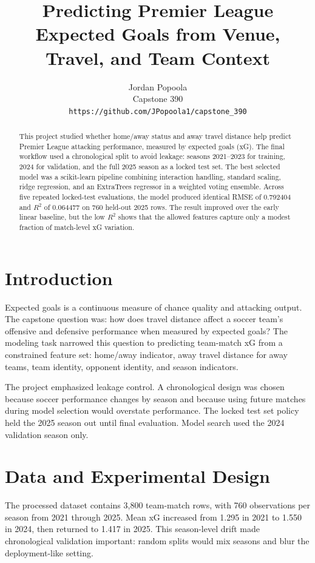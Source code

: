 \documentclass{article}
\title{Predicting Premier League Expected Goals from Venue, Travel, and Team Context}
\author{Jordan Popoola\\Capstone 390\\\texttt{https://github.com/JPopoola1/capstone_390}}
\begin{document}
\maketitle

\begin{abstract}
This project studied whether home/away status and away travel distance help predict Premier League attacking performance, measured by expected goals (xG). The final workflow used a chronological split to avoid leakage: seasons 2021--2023 for training, 2024 for validation, and the full 2025 season as a locked test set. The best selected model was a scikit-learn pipeline combining interaction handling, standard scaling, ridge regression, and an ExtraTrees regressor in a weighted voting ensemble. Across five repeated locked-test evaluations, the model produced identical RMSE of 0.792404 and $R^2$ of 0.064477 on 760 held-out 2025 rows. The result improved over the early linear baseline, but the low $R^2$ shows that the allowed features capture only a modest fraction of match-level xG variation.
\end{abstract}

\section{Introduction}
Expected goals is a continuous measure of chance quality and attacking output. The capstone question was: how does travel distance affect a soccer team's offensive and defensive performance when measured by expected goals? The modeling task narrowed this question to predicting team-match xG from a constrained feature set: home/away indicator, away travel distance for away teams, team identity, opponent identity, and season indicators.

The project emphasized leakage control. A chronological design was chosen because soccer performance changes by season and because using future matches during model selection would overstate performance. The locked test set policy held the 2025 season out until final evaluation. Model search used the 2024 validation season only.

\section{Data and Experimental Design}
The processed dataset contains 3,800 team-match rows, with 760 observations per season from 2021 through 2025. Mean xG increased from 1.295 in 2021 to 1.550 in 2024, then returned to 1.417 in 2025. This season-level drift made chronological validation important: random splits would mix seasons and blur the deployment-like setting.
\end{document}

